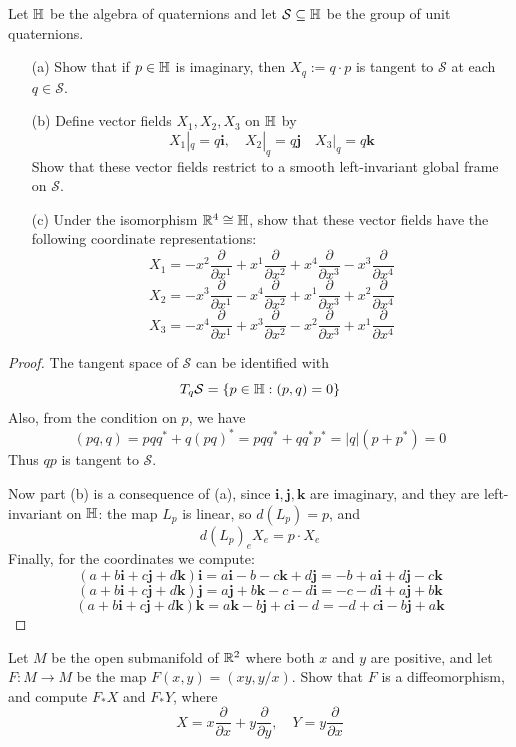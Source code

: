 \begin{exercise}
Let $\mathbb{H}$ be the algebra of quaternions and let $\mathcal{S}\subseteq\mathbb{H}$ be the group of unit quaternions.
\begin{itemize}
\item[(a)] Show that if $p\in\mathbb{H}$ is imaginary, then $X_q:=q\cdot p$ is tangent to $\mathcal{S}$ at each $q\in\mathcal{S}$.
\item[(b)] Define vector fields $X_1,X_2,X_3$ on $\mathbb{H}$ by
\[X_1|_q=q\mathbf{i},\quad X_2|_q=q\mathbf{j}\quad X_3|_q=q\mathbf{k}\]
Show that these vector fields restrict to a smooth left-invariant global frame on $\mathcal{S}$.
\item[(c)] Under the isomorphism $\mathbb{R}^4\cong\mathbb{H}$, show that these vector fields have the following coordinate representations:
\[X_1=-x^2\frac{\partial}{\partial x^1}+x^1\frac{\partial}{\partial x^2}+x^4\frac{\partial}{\partial x^3}-x^3\frac{\partial}{\partial x^4}\]
\[X_2=-x^3\frac{\partial}{\partial x^1}-x^4\frac{\partial}{\partial x^2}+x^1\frac{\partial}{\partial x^3}+x^2\frac{\partial}{\partial x^4}\]
\[X_3=-x^4\frac{\partial}{\partial x^1}+x^3\frac{\partial}{\partial x^2}-x^2\frac{\partial}{\partial x^3}+x^1\frac{\partial}{\partial x^4}\]
\end{itemize}
\end{exercise}
\begin{proof}
The tangent space of $\mathcal{S}$ can be identified with 
\[T_q\mathcal{S}=\{p\in\mathbb{H}:(p,q)=0\}\]
Also, from the condition on $p$, we have
\[(pq,q)=pqq^*+q(pq)^*=pqq^*+qq^*p^*=|q|(p+p^*)=0\]
Thus $qp$ is tangent to $\mathcal{S}$.\par
Now part (b) is a consequence of (a), since $\mathbf{i,j,k}$ are imaginary, and they are left-invariant on $\mathbb{H}$: the map $L_p$ is linear, so $d(L_p)=p$, and
\[d(L_p)_eX_e=p\cdot X_e\]
Finally, for the coordinates we compute:
\[(a+b\mathbf{i}+c\mathbf{j}+d\mathbf{k})\mathbf{i}=a\mathbf{i}-b-c\mathbf{k}+d\mathbf{j}=-b+a\mathbf{i}+d\mathbf{j}-c\mathbf{k}\]
\[(a+b\mathbf{i}+c\mathbf{j}+d\mathbf{k})\mathbf{j}=a\mathbf{j}+b\mathbf{k}-c-d\mathbf{i}=-c-d\mathbf{i}+a\mathbf{j}+b\mathbf{k}\]
\[(a+b\mathbf{i}+c\mathbf{j}+d\mathbf{k})\mathbf{k}=a\mathbf{k}-b\mathbf{j}+c\mathbf{i}-d=-d+c\mathbf{i}-b\mathbf{j}+a\mathbf{k}\]
\end{proof}
\begin{exercise}
Let $M$ be the open submanifold of $\mathbb{R}^2$ where both $x$ and $y$ are positive, and let $F:M\to M$ be the map $F(x,y)=(xy,y/x)$. Show that $F$ is a diffeomorphism, and compute $F_*X$ and $F_*Y$, where
\[X=x\frac{\partial}{\partial x}+y\frac{\partial}{\partial y},\quad Y=y\frac{\partial}{\partial x}\]
\end{exercise}
